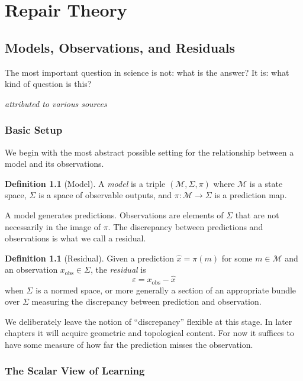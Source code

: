 \documentclass[12pt,oneside]{book}
\theoremstyle{plain}
\theoremstyle{definition}
\newtheorem{definition}[theorem]{Definition}
\theoremstyle{remark}
\newcommand{\M}{\mathcal{M}}
\newcommand{\eps}{\varepsilon}
\newcommand{\1}{\mathbf{1}}
\begin{document}
\part{Repair Theory}

\chapter{Models, Observations, and Residuals}

\epigraph{The most important question in science is not: what is the answer? It is: what kind of question is this?}{\textit{attributed to various sources}}

\section{Basic Setup}

We begin with the most abstract possible setting for the relationship between a model and its observations.

\begin{definition}[Model]
A \emph{model} is a triple $(\M, \Sigma, \pi)$ where $\M$ is a state space, $\Sigma$ is a space of observable outputs, and $\pi : \M \to \Sigma$ is a prediction map.
\end{definition}

A model generates predictions. Observations are elements of $\Sigma$ that are not necessarily in the image of $\pi$. The discrepancy between predictions and observations is what we call a residual.

\begin{definition}[Residual]
Given a prediction $\hat{x} = \pi(m)$ for some $m \in \M$ and an observation $x_{\mathrm{obs}} \in \Sigma$, the \emph{residual} is
\[
\eps = x_{\mathrm{obs}} - \hat{x}
\]
when $\Sigma$ is a normed space, or more generally a section of an appropriate bundle over $\Sigma$ measuring the discrepancy between prediction and observation.
\end{definition}

We deliberately leave the notion of ``discrepancy'' flexible at this stage. In later chapters it will acquire geometric and topological content. For now it suffices to have some measure of how far the prediction misses the observation.

\section{The Scalar View of Learning}
\end{document}
